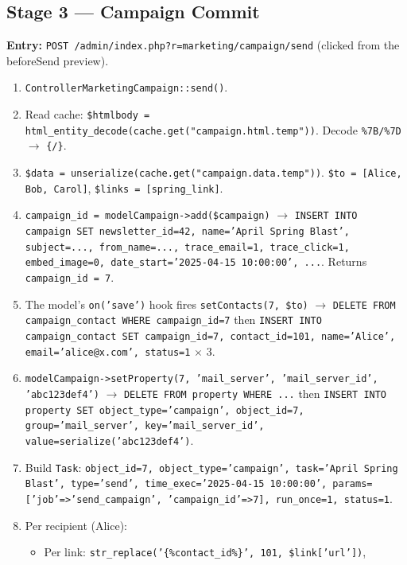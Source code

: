 \documentclass[11pt,a4paper]{article}
\begin{document}
\subsection{Stage 3 --- Campaign Commit}

\textbf{Entry:} \texttt{POST /admin/index.php?r=marketing/campaign/send}
(clicked from the beforeSend preview).

\begin{enumerate}[leftmargin=1.6em,itemsep=2pt]
  \item \texttt{ControllerMarketingCampaign::send()}.
  \item Read cache: \texttt{\$htmlbody =
        html\_entity\_decode(cache.get("campaign.html.temp"))}.
        Decode \texttt{\%7B/\%7D} $\to$ \texttt{\{/\}}.
  \item \texttt{\$data = unserialize(cache.get("campaign.data.temp"))}.
        \texttt{\$to = [Alice, Bob, Carol]},
        \texttt{\$links = [spring\_link]}.
  \item \texttt{campaign\_id = modelCampaign->add(\$campaign)}
        $\to$ \texttt{INSERT INTO campaign SET newsletter\_id=42,
        name='April Spring Blast', subject=..., from\_name=...,
        trace\_email=1, trace\_click=1, embed\_image=0,
        date\_start='2025-04-15 10:00:00', ...}. Returns
        \texttt{campaign\_id = 7}.
  \item The model's \texttt{on('save')} hook fires
        \texttt{setContacts(7, \$to)} $\to$
        \texttt{DELETE FROM campaign\_contact WHERE campaign\_id=7}
        then \texttt{INSERT INTO campaign\_contact SET
        campaign\_id=7, contact\_id=101, name='Alice',
        email='alice@x.com', status=1} $\times$ 3.
  \item \texttt{modelCampaign->setProperty(7, 'mail\_server',
        'mail\_server\_id', 'abc123def4')} $\to$
        \texttt{DELETE FROM property WHERE ...} then
        \texttt{INSERT INTO property SET object\_type='campaign',
        object\_id=7, group='mail\_server',
        key='mail\_server\_id', value=serialize('abc123def4')}.
  \item Build \texttt{Task}: \texttt{object\_id=7,
        object\_type='campaign', task='April Spring Blast',
        type='send', time\_exec='2025-04-15 10:00:00',
        params=['job'=>'send\_campaign', 'campaign\_id'=>7],
        run\_once=1, status=1}.
  \item Per recipient (Alice):
        \begin{itemize}[itemsep=2pt]
          \item Per link: \texttt{str\_replace('\{\%contact\_id\%\}', 101, \$link['url'])},

\end{itemize}
\end{enumerate}
\end{document}
